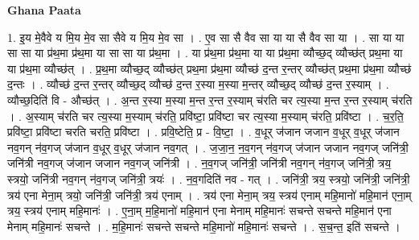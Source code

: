 \documentclass[17pt]{extarticle}
\begin{document}
\textbf{Ghana Paata } \newline

1. इ॒य मे॒वैवे य मि॒य मे॒व सा सैवे य मि॒य मे॒व सा । . ए॒व सा सै वैव सा या या सै वैव सा या । . सा या या सा सा या प्र॑थ॒मा प्र॑थ॒मा या सा सा या प्र॑थ॒मा । . या प्र॑थ॒मा प्र॑थ॒मा या या प्र॑थ॒मा व्यौच्छ॒द् व्यौच्छ॑त् प्रथ॒मा या या प्र॑थ॒मा व्यौच्छ॑त् । . प्र॒थ॒मा व्यौच्छ॒द् व्यौच्छ॑त् प्रथ॒मा प्र॑थ॒मा व्यौच्छ॑ द॒न्त र॒न्तर् व्यौच्छ॑त् प्रथ॒मा प्र॑थ॒मा व्यौच्छ॑ द॒न्तः । . व्यौच्छ॑ द॒न्त र॒न्तर् व्यौच्छ॒द् व्यौच्छ॑ द॒न्त र॒स्या म॒स्या म॒न्तर् व्यौच्छ॒द् व्यौच्छ॑ द॒न्त र॒स्याम् । . व्यौच्छ॒दिति॑ वि - औच्छ॑त् । . अ॒न्त र॒स्या म॒स्या म॒न्त र॒न्त र॒स्याम् च॑रति चर त्य॒स्या म॒न्त र॒न्त र॒स्याम् च॑रति । . अ॒स्याम् च॑रति चर त्य॒स्या म॒स्याम् च॑रति॒ प्रवि॑ष्टा॒ प्रवि॑ष्टा चर त्य॒स्या म॒स्याम् च॑रति॒ प्रवि॑ष्टा । . च॒र॒ति॒ प्रवि॑ष्टा॒ प्रवि॑ष्टा चरति चरति॒ प्रवि॑ष्टा । . प्रवि॒ष्टेति॒ प्र - वि॒ष्टा॒ । . व॒धूर् ज॑जान जजान व॒धूर् व॒धूर् ज॑जान नव॒गन् न॑व॒गज् ज॑जान व॒धूर् व॒धूर् ज॑जान नव॒गत् । . ज॒जा॒न॒ न॒व॒गन् न॑व॒गज् ज॑जान जजान नव॒गज् जनि॑त्री॒ जनि॑त्री नव॒गज् ज॑जान जजान नव॒गज् जनि॑त्री । . न॒व॒गज् जनि॑त्री॒ जनि॑त्री नव॒गन् न॑व॒गज् जनि॑त्री॒ त्रय॒ स्त्रयो॒ जनि॑त्री नव॒गन् न॑व॒गज् जनि॑त्री॒ त्रयः॑ । . न॒व॒गदिति॑ नव - गत् । . जनि॑त्री॒ त्रय॒ स्त्रयो॒ जनि॑त्री॒ जनि॑त्री॒ त्रय॑ एना मेना॒म् त्रयो॒ जनि॑त्री॒ जनि॑त्री॒ त्रय॑ एनाम् । . त्रय॑ एना मेना॒म् त्रय॒ स्त्रय॑ एनाम् महि॒मानो॑ महि॒मान॑ एना॒म् त्रय॒ स्त्रय॑ एनाम् महि॒मानः॑ । . ए॒ना॒म् म॒हि॒मानो॑ महि॒मान॑ एना मेनाम् महि॒मानः॑ सचन्ते सचन्ते महि॒मान॑ एना मेनाम् महि॒मानः॑ सचन्ते । . म॒हि॒मानः॑ सचन्ते सचन्ते महि॒मानो॑ महि॒मानः॑ सचन्ते । . स॒च॒न्त॒ इति॑ सचन्ते । \newline
\end{document}
